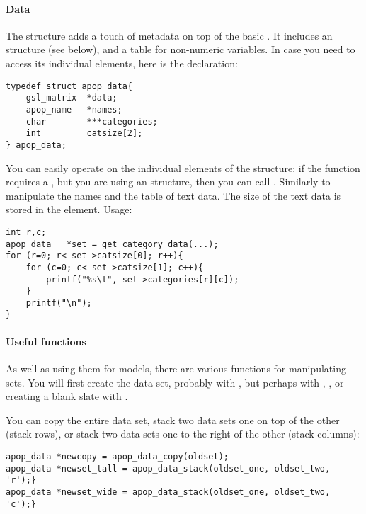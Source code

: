 \paragraph{Data} 
The  structure adds a touch of metadata on top of the
basic . It includes an  structure (see
below), and a table for non-numeric variables. In case you need to access
its individual elements, here is the declaration:

\begin{lstlisting}
typedef struct apop_data{
    gsl_matrix  *data;
    apop_name   *names;
    char        ***categories;
    int         catsize[2];
} apop_data;
\end{lstlisting}
You can easily operate on the individual elements of the structure:
if the  function requires a
, but you are using an 
structure, then you can call
. Similarly to
manipulate the names and the table of text data. The size of the text
data is stored in the  element. Usage:

\begin{lstlisting}
int r,c;
apop_data   *set = get_category_data(...);
for (r=0; r< set->catsize[0]; r++){
    for (c=0; c< set->catsize[1]; c++){
        printf("%s\t", set->categories[r][c]);
    }
    printf("\n");
}
\end{lstlisting}

\paragraph{Useful functions} As well as using them for models, there are
various functions for manipulating  sets. You will
first
create the data set, probably with , but perhaps
with , , or
creating a blank slate with .

You can copy the entire data set, 
stack two data sets one on top of the other (stack rows), or 
stack two data sets one to the right of the other (stack columns):
\begin{lstlisting}
apop_data *newcopy = apop_data_copy(oldset);
apop_data *newset_tall = apop_data_stack(oldset_one, oldset_two, 'r');}
apop_data *newset_wide = apop_data_stack(oldset_one, oldset_two, 'c');}
\end{lstlisting}

